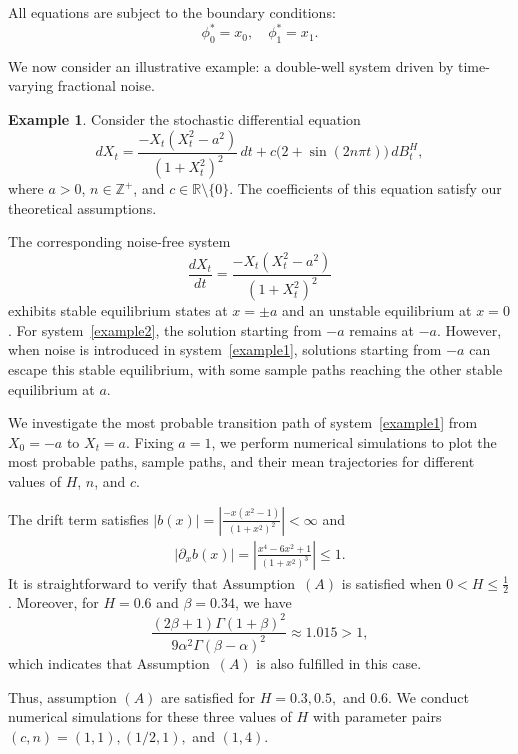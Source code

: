 \documentclass[preprint,12pt]{elsarticle}
\theoremstyle{definition}  %
\newtheorem{example}{Example}[section]
\theoremstyle{plain}  %
\begin{document}
All equations are subject to the boundary conditions:
\[
\phi_0^* = x_0, \quad \phi_1^* = x_1.
\]

We now consider an illustrative example: a double-well system driven by time-varying fractional noise.

\begin{example}
Consider the stochastic differential equation
\begin{equation}\label{example1}
dX_t = \frac{-X_t(X_t^2 - a^2)}{(1+X_t^2)^2}\,dt + c\bigl(2 + \sin(2n\pi t)\bigr)\,dB^H_t,
\end{equation}
where $a > 0$, $n \in \mathbb{Z}^+$, and $c \in \mathbb{R}\setminus\{0\}$.  
The coefficients of this equation satisfy our theoretical assumptions.

The corresponding noise-free system
\begin{equation}\label{example2}
   \frac{dX_t}{dt} = \frac{-X_t(X_t^2 - a^2)}{(1+X_t^2)^2}
\end{equation}
exhibits stable equilibrium states at $x = \pm a$ and an unstable equilibrium at $x = 0$.  
For system~\eqref{example2}, the solution starting from $-a$ remains at $-a$. 
However, when noise is introduced in system~\eqref{example1}, 
solutions starting from $-a$ can escape this stable equilibrium, 
with some sample paths reaching the other stable equilibrium at $a$. 

We investigate the most probable transition path of system~\eqref{example1} from $X_0 = -a$ to $X_t = a$. 
Fixing $a = 1$, we perform numerical simulations to plot the most probable paths, 
sample paths, and their mean trajectories for different values of $H$, $n$, and $c$. 

The drift term satisfies $|b(x)| = \left|\frac{-x(x^2-1)}{(1+x^2)^2}\right| < \infty$ and 
\begin{align*}
    |\partial_x b(x)| = \left| \frac{x^4-6x^2+1}{(1+x^2)^3} \right| \leq 1.
\end{align*}
It is straightforward to verify that Assumption~\((A)\) is satisfied when \(0 < H \leq \tfrac{1}{2}\). 
Moreover, for \(H = 0.6\) and \(\beta = 0.34\), we have
\begin{equation}
   \frac{(2\beta+1)\Gamma(1+\beta)^2}{9\alpha^2 \Gamma(\beta-\alpha)^2} \approx 1.015 > 1,
\end{equation}
which indicates that Assumption~\((A)\) is also fulfilled in this case.

Thus,  assumption \((A)\) are satisfied for $H = 0.3, 0.5,$ and $0.6$.  
We conduct numerical simulations for these three values of $H$ with parameter pairs $(c,n) = (1,1), (1/2,1),$ and $(1,4)$.


\end{example}
\end{document}
